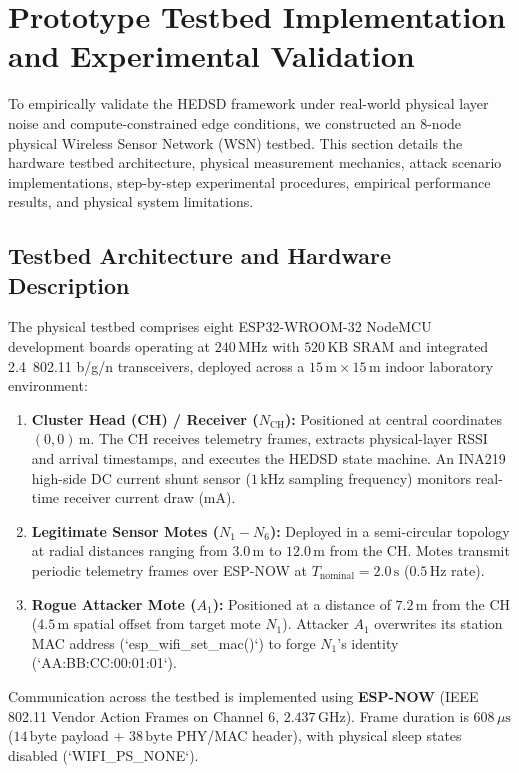 \section{Prototype Testbed Implementation and Experimental Validation}
\label{sec:prototype_testbed_validation}

To empirically validate the \ac{HEDSD} framework under real-world physical layer noise and compute-constrained edge conditions, we constructed an 8-node physical Wireless Sensor Network (\ac{WSN}) testbed. This section details the hardware testbed architecture, physical measurement mechanics, attack scenario implementations, step-by-step experimental procedures, empirical performance results, and physical system limitations.

\subsection{Testbed Architecture and Hardware Description}
The physical testbed comprises eight ESP32-WROOM-32 NodeMCU development boards operating at $240\,\text{MHz}$ with $520\,\text{KB}$ SRAM and integrated 2.4\, 802.11 b/g/n transceivers, deployed across a $15\,\text{m} \times 15\,\text{m}$ indoor laboratory environment:
\begin{enumerate}
    \item \textbf{Cluster Head (CH) / Receiver ($N_{\text{CH}}$):} Positioned at central coordinates $(0, 0)\,\text{m}$. The CH receives telemetry frames, extracts physical-layer \ac{RSSI} and arrival timestamps, and executes the \ac{HEDSD} state machine. An INA219 high-side DC current shunt sensor ($1\,\text{kHz}$ sampling frequency) monitors real-time receiver current draw ($\text{mA}$).
    \item \textbf{Legitimate Sensor Motes ($N_1 - N_6$):} Deployed in a semi-circular topology at radial distances ranging from $3.0\,\text{m}$ to $12.0\,\text{m}$ from the CH. Motes transmit periodic telemetry frames over ESP-NOW at $T_{\text{nominal}} = 2.0\,\text{s}$ ($0.5\,\text{Hz}$ rate).
    \item \textbf{Rogue Attacker Mote ($A_1$):} Positioned at a distance of $7.2\,\text{m}$ from the CH ($4.5\,\text{m}$ spatial offset from target mote $N_1$). Attacker $A_1$ overwrites its station MAC address (`esp_wifi_set_mac()`) to forge $N_1$'s identity (`AA:BB:CC:00:01:01`).
\end{enumerate}

Communication across the testbed is implemented using \textbf{ESP-NOW} (IEEE 802.11 Vendor Action Frames on Channel 6, $2.437\,\text{GHz}$). Frame duration is $608\,\mu\text{s}$ ($14\,\text{byte}$ payload + $38\,\text{byte}$ PHY/MAC header), with physical sleep states disabled (`WIFI_PS_NONE`).

